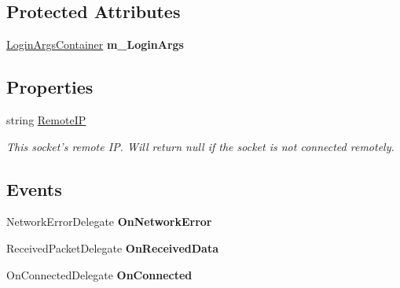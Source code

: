 \subsection*{Protected Attributes}
\begin{DoxyCompactItemize}
\item 
\hypertarget{class_gonzo_net_1_1_network_client_ab2fd937133970c100e56abbe70bb4365}{\hyperlink{class_gonzo_net_1_1_login_args_container}{Login\+Args\+Container} {\bfseries m\+\_\+\+Login\+Args}}\label{class_gonzo_net_1_1_network_client_ab2fd937133970c100e56abbe70bb4365}

\end{DoxyCompactItemize}
\subsection*{Properties}
\begin{DoxyCompactItemize}
\item 
string \hyperlink{class_gonzo_net_1_1_network_client_a3bd067d6413ed635c8e461a2c039f4ff}{Remote\+I\+P}
\begin{DoxyCompactList}\small\item\em This socket's remote I\+P. Will return null if the socket is not connected remotely. \end{DoxyCompactList}\end{DoxyCompactItemize}
\subsection*{Events}
\begin{DoxyCompactItemize}
\item 
\hypertarget{class_gonzo_net_1_1_network_client_ad074e70d5e3a9f62f05c914a7665409a}{Network\+Error\+Delegate {\bfseries On\+Network\+Error}}\label{class_gonzo_net_1_1_network_client_ad074e70d5e3a9f62f05c914a7665409a}

\item 
\hypertarget{class_gonzo_net_1_1_network_client_adc31a120c560167563c8952481a86259}{Received\+Packet\+Delegate {\bfseries On\+Received\+Data}}\label{class_gonzo_net_1_1_network_client_adc31a120c560167563c8952481a86259}

\item 
\hypertarget{class_gonzo_net_1_1_network_client_a7aad9852c87a1a9748cbd1917091e415}{On\+Connected\+Delegate {\bfseries On\+Connected}}\label{class_gonzo_net_1_1_network_client_a7aad9852c87a1a9748cbd1917091e415}

\end{DoxyCompactItemize}


